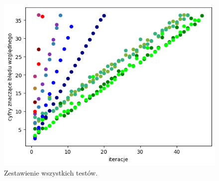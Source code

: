 \documentclass[11pt,wide]{mwart}
\begin{document}
\begin{figure}[H]
	\begin{center}
	\includegraphics[scale=0.6]{zestawienie_wszystko}
	\end{center}
	\caption{Zestawienie wszystkich testów.}
\end{figure}
\end{document}
